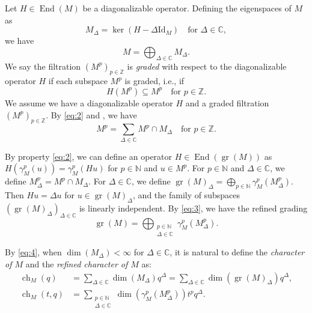 \documentclass[a4paper, 12pt, reqno]{amsart}
\theoremstyle{remark}
\DeclareMathOperator{\ch}{ch}
\DeclareMathOperator{\gr}{gr}
\DeclareMathOperator{\End}{End}
\newcommand{\Id}{{\mathrm{Id}}}
\begin{document}
Let $H \in \End(M)$ be a diagonalizable operator.
Defining the eigenspaces of $M$ as
\begin{equation*}
  M_\Delta = \ker(H - \Delta\Id_M) \quad \text{for $\Delta \in \mathbb{C}$},
\end{equation*}
we have
\begin{equation*}
  M = \bigoplus_{\Delta \in \mathbb{C}}M_\Delta.
\end{equation*}
We say the filtration $(M^p)_{p \in \mathbb{Z}}$ is \emph{graded} with respect to the diagonalizable operator $H$ if each subspace $M^p$ is graded, i.e., if
\begin{equation}
  \label{eq:2}
  H(M^p) \subseteq M^p \quad \text{for $p \in \mathbb{Z}$}.
\end{equation}
We assume we have a diagonalizable operator $H$ and a graded filtration $(M^p)_{p \in \mathbb{Z}}$.
By \eqref{eq:2} and \cite[Corollary 1.1]{kac_bombay_2013}, we have
\begin{equation}
  \label{eq:3}
  M^p = \sum_{\Delta \in \mathbb{C}}M^p \cap M_\Delta \quad \text{for $p \in \mathbb{Z}$}.
\end{equation}

By property \eqref{eq:2}, we can define an operator $H \in \End(\gr(M))$ as $H(\gamma^p_M(u)) = \gamma^p_M(Hu)$ for $p \in \mathbb{N}$ and $u \in M^p$.
For $p \in \mathbb{N}$ and $\Delta \in \mathbb{C}$, we define $M^p_\Delta = M^p \cap M_\Delta$.
For $\Delta \in \mathbb{C}$, we define $\gr(M)_\Delta = \bigoplus_{p \in \mathbb{N}}\gamma_M^p(M^p_\Delta)$.
Then $Hu = \Delta u$ for $u \in \gr(M)_\Delta$, and the family of subspaces $(\gr(M)_\Delta)_{\Delta \in \mathbb{C}}$ is linearly independent.
By \eqref{eq:3}, we have the refined grading
\begin{equation}
  \label{eq:4}
  \gr(M) = \bigoplus_{\substack{p \in \mathbb{N} \\ \Delta \in \mathbb{C}}}\gamma^p_M(M^p_\Delta).
\end{equation}

By \eqref{eq:4}, when $\dim(M_\Delta) < \infty$ for $\Delta \in \mathbb{C}$, it is natural to define the \emph{character of $M$} and the \emph{refined character of $M$} as:
\begin{align*}
  \ch_M(q) &= \sum_{\Delta \in \mathbb{C}}\dim(M_\Delta)q^\Delta = \sum_{\Delta \in \mathbb{C}}\dim(\gr(M)_\Delta)q^\Delta, \\
  \ch_M(t, q) &= \sum_{\substack{p \in \mathbb{N} \\ \Delta \in \mathbb{C}}}\dim(\gamma_M^p(M^p_\Delta))t^pq^\Delta.
\end{align*}
\end{document}

